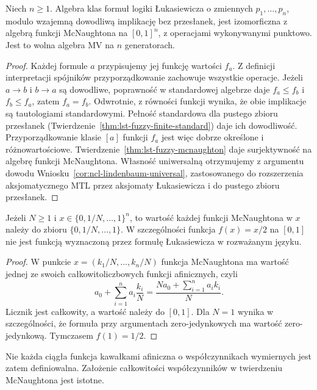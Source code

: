 \begin{wniosek}
\label{cor:ncl-free-mv-functions}
Niech $n\geq1$. Algebra klas formuł logiki Łukasiewicza
o zmiennych $p_1,\ldots,p_n$, modulo wzajemną dowodliwą
implikację bez przesłanek, jest izomorficzna z algebrą
funkcji McNaughtona na $[0,1]^n$, z operacjami
wykonywanymi punktowo. Jest to wolna algebra MV
na $n$ generatorach.
\end{wniosek}
\begin{proof}
Każdej formule $a$ przypisujemy jej funkcję wartości
$f_a$. Z definicji interpretacji spójników
przyporządkowanie zachowuje wszystkie operacje.
Jeżeli $a\to b$ i $b\to a$ są dowodliwe, poprawność
w standardowej algebrze daje $f_a\leq f_b$ i
$f_b\leq f_a$, zatem $f_a=f_b$.
Odwrotnie, z równości funkcji wynika, że obie implikacje
są tautologiami standardowymi. Pełność standardowa
dla pustego zbioru przesłanek
(Twierdzenie~\ref{thm:lst-fuzzy-finite-standard})
daje ich dowodliwość. Przyporządkowanie klasie $[a]$
funkcji $f_a$ jest więc dobrze określone i różnowartościowe.
Twierdzenie~\ref{thm:lst-fuzzy-mcnaughton} daje
surjektywność na algebrę funkcji McNaughtona.
Własność uniwersalną otrzymujemy z argumentu dowodu
Wniosku~\ref{cor:ncl-lindenbaum-universal}, zastosowanego
do rozszerzenia aksjomatycznego MTL przez aksjomaty
Łukasiewicza i do pustego zbioru przesłanek.
\end{proof}

\begin{wniosek}
\label{cor:ncl-mv-rational-grid}
Jeżeli $N\geq1$ i $x\in\{0,1/N,\ldots,1\}^n$,
to wartość każdej funkcji McNaughtona w $x$ należy
do zbioru $\{0,1/N,\ldots,1\}$. W szczególności funkcja
$f(x)=x/2$ na $[0,1]$ nie jest funkcją wyznaczoną
przez formułę Łukasiewicza w rozważanym języku.
\end{wniosek}
\begin{proof}
W punkcie $x=(k_1/N,\ldots,k_n/N)$ funkcja
McNaughtona ma wartość jednej ze swoich
całkowitoliczbowych funkcji afinicznych, czyli
\[
 a_0+\sum_{i=1}^n a_i\frac{k_i}{N}
 =\frac{Na_0+\sum_{i=1}^n a_i k_i}{N}.
\]
Licznik jest całkowity, a wartość należy do $[0,1]$.
Dla $N=1$ wynika w szczególności, że formuła
przy argumentach zero-jedynkowych ma wartość
zero-jedynkową. Tymczasem $f(1)=1/2$.
\end{proof}
Nie każda ciągła funkcja kawałkami afiniczna
o współczynnikach wymiernych jest zatem definiowalna.
Założenie całkowitości współczynników w twierdzeniu
McNaughtona jest istotne.

